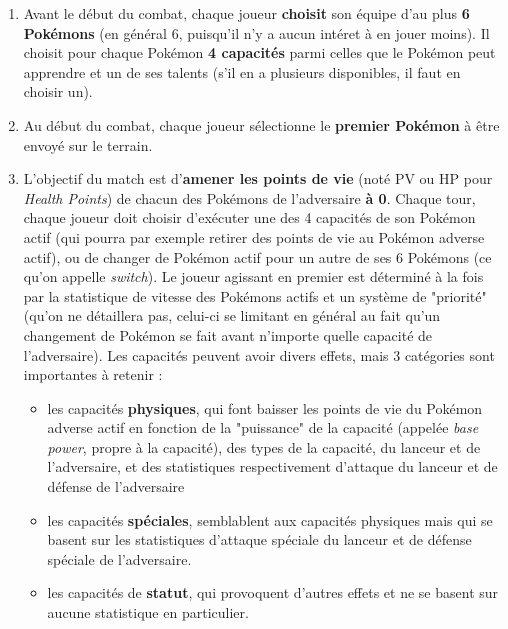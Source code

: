 \documentclass[a4paper,12pt]{article}
\begin{document}
\begin{enumerate}
    \item Avant le début du combat, chaque joueur \textbf{choisit} son équipe
    d'au plus \textbf{6 Pokémons} (en général 6, puisqu'il n'y a aucun intéret à
    en jouer moins). Il choisit pour chaque Pokémon \textbf{4 capacités} parmi
    celles que le Pokémon peut apprendre et un de ses talents (s'il en a
    plusieurs disponibles, il faut en choisir un).
    \item Au début du combat, chaque joueur sélectionne le \textbf{premier
    Pokémon} à être envoyé sur le terrain.
    \item L'objectif du match est d'\textbf{amener les points de vie} (noté PV
    ou HP pour \textit{Health Points}) de chacun des Pokémons de l'adversaire
    \textbf{à 0}. Chaque tour, chaque joueur doit choisir d'exécuter une des 4
    capacités de son Pokémon actif (qui pourra par exemple retirer des points de
    vie au Pokémon adverse actif), ou de changer de Pokémon actif pour un autre
    de ses 6 Pokémons (ce qu'on appelle \textit{switch}). Le joueur agissant en
    premier est déterminé à la fois par la statistique de vitesse des Pokémons
    actifs et un système de "priorité" (qu'on ne détaillera pas, celui-ci se
    limitant en général au fait qu'un changement de Pokémon se fait avant
    n'importe quelle capacité de l'adversaire). Les capacités peuvent avoir
    divers effets, mais 3 catégories sont importantes à retenir :
          \begin{itemize}
              \item les capacités \textbf{physiques}, qui font baisser les
              points de vie du Pokémon adverse actif en fonction de la
              "puissance" de la capacité (appelée \textit{base power}, propre à
              la capacité), des types de la capacité, du lanceur et de
              l'adversaire, et des statistiques respectivement d'attaque du
              lanceur et de défense de l'adversaire
              \item les capacités \textbf{spéciales}, semblablent aux capacités
              physiques mais qui se basent sur les statistiques d'attaque
              spéciale du lanceur et de défense spéciale de l'adversaire.
              \item les capacités de \textbf{statut}, qui provoquent d'autres
              effets et ne se basent sur aucune statistique en particulier.
          \end{itemize}
\end{enumerate}
\end{document}

